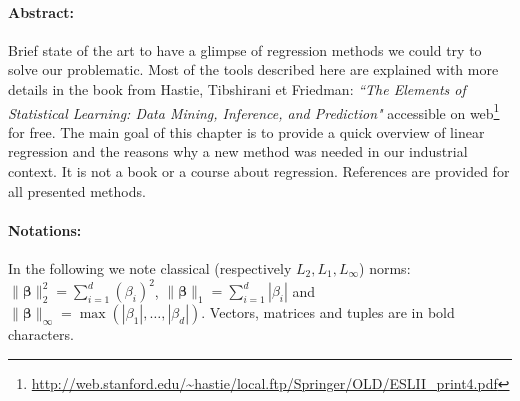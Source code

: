 \documentclass[12pt,a4paper]{report}
\begin{document}
\paragraph{Abstract:} Brief state of the art to have a glimpse of regression methods we could try to solve our problematic.
Most of the tools described here are explained with more details in the book from  Hastie, Tibshirani et Friedman: {\it ``The Elements of Statistical Learning: Data Mining, Inference, and Prediction" } accessible on web\footnote{ \url{http://web.stanford.edu/~hastie/local.ftp/Springer/OLD/ESLII_print4.pdf}} for free. The main goal of this chapter is to provide a quick overview of linear regression and the reasons why a new method was needed in our industrial context. It is not a book or a course about regression. References are provided for all presented methods.
	
	
%			
		
%			
%



\paragraph{Notations:}	
In the following we note classical (respectively $L_2,L_1,L_{\infty}$) norms: $\parallel\boldsymbol{\beta}\parallel_2^2=\sum_{i=1}^d(\beta_i)^2$, $\parallel\boldsymbol{\beta} \parallel_1=\sum_{i=1}^d|\beta_i| $ and $\parallel\boldsymbol{\beta} \parallel_{\infty}=\operatorname{max}(|\beta_1|,\dots,|\beta_d|)$. Vectors, matrices and tuples are in bold characters.
\end{document}
